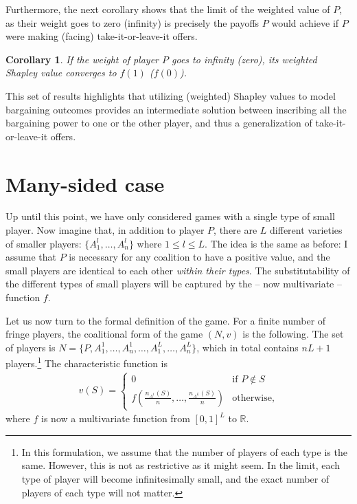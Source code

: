 \documentclass[a4paper]{article}
\newtheorem{corollary}{Corollary}
\begin{document}
Furthermore, the next corollary shows that the limit of the weighted value of $P$, as their weight goes to zero (infinity) is precisely the payoffs $P$ would achieve if $P$ were making (facing) take-it-or-leave-it offers.
\begin{corollary}
    \label{cor:paltform_value_weighted_2}
    If the weight of player $P$ goes to infinity (zero), its weighted Shapley value converges to $f(1)$ ($f(0)$).
\end{corollary}
This set of results highlights that utilizing (weighted) Shapley values to model bargaining outcomes provides an intermediate solution between inscribing all the bargaining power to one or the other player, and thus a generalization of take-it-or-leave-it offers.



\section{Many-sided case}
\label{sec:many_sided}

Up until this point, we have only considered games with a single type of small player.
Now imagine that, in addition to player $P$, there are $L$ different varieties of smaller players: $\{A^l_1, \dots, A^l_n\}$ where $1 \leq l \leq L$.
The idea is the same as before: I assume that $P$ is necessary for any coalition to have a positive value, and the small players are identical to each other \emph{within their types}.
The substitutability of the different types of small players will be captured by the -- now multivariate -- function $f$.

Let us now turn to the formal definition of the game.
For a finite number of fringe players, the coalitional form of the game $(N, v)$ is the following.
The set of players is $N = \{P, A^1_1, \dots, A^1_n, \dots, A^L_1, \dots, A^L_n\}$, which in total contains $nL + 1$ players.\footnote{
    In this formulation, we assume that the number of players of each type is the same.
    However, this is not as restrictive as it might seem.
    In the limit, each type of player will become infinitesimally small, and the exact number of players of each type will not matter.
}
The characteristic function is
\begin{align*}
    v(S) = \begin{cases}
        0                                                & \text{if } P \notin S \\
        f\left(\frac{n_{A^1}(S)}{n}, \dots, \frac{n_{A^L}(S)}{n}\right) & \text{otherwise},
    \end{cases}
\end{align*}
where $f$ is now a multivariate function from $[0, 1]^L$ to $\mathbb{R}$.
\end{document}
